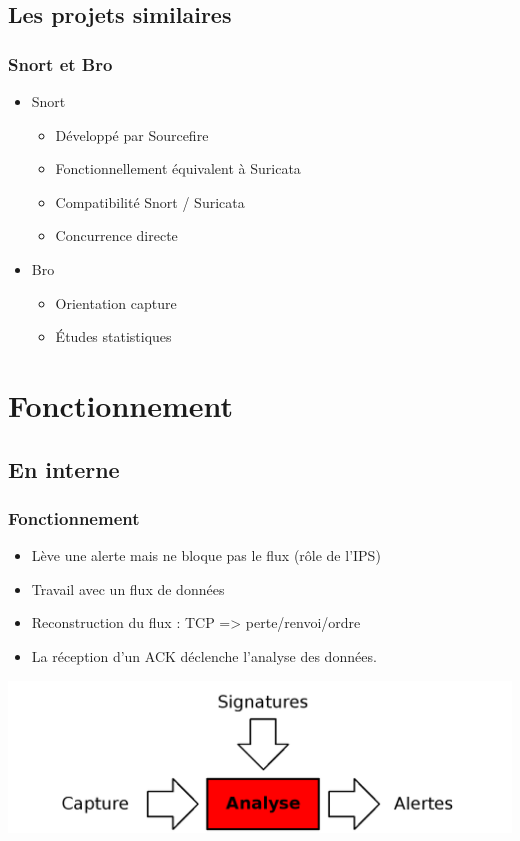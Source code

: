 \documentclass{beamer}
\begin{document}
\subsection{Les projets similaires}
\begin{frame}
\frametitle{Snort et Bro}
\begin{itemize}
[triangle]
\item Snort
\begin{itemize}
\item Développé par Sourcefire
\item Fonctionnellement équivalent à Suricata
\item Compatibilité Snort / Suricata
\item Concurrence directe
\end{itemize}
\pause
\item Bro
\begin{itemize}
\item Orientation capture
\item Études statistiques
\end{itemize}
\end{itemize}
\end{frame}

\section{Fonctionnement}
\subsection{En interne}
\begin{frame}
\frametitle{Fonctionnement}
\begin{itemize}
[triangle]
\item Lève une alerte mais ne bloque pas le flux (rôle de l'IPS)
\item Travail avec un flux de données
\item Reconstruction du flux : TCP => perte/renvoi/ordre
\item La réception d'un ACK déclenche l'analyse des données.
\end{itemize}
\begin{center}
\includegraphics[scale=0.15]{img/matching.png}
\end{center}
\end{frame}
\end{document}
